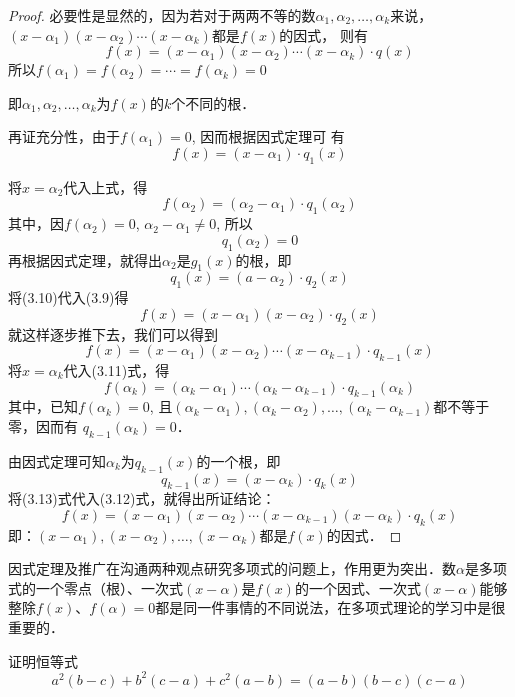 \begin{proof}
必要性是显然的，因为若对于两两不等的数$\alpha_1,\alpha_2,\ldots,\alpha_k$来说，$(x-\alpha_1)(x-\alpha_2)\cdots(x-\alpha_k)$都是$f(x)$的因式，
则有    
\[f(x)=(x-\alpha_1)(x-\alpha_2)\cdots(x-\alpha_k)\cdot q(x)\]
所以$f(\alpha_1)=f(\alpha_2) =\cdots=f(\alpha_k)=0$

即$\alpha_1,\alpha_2,\ldots,\alpha_k$为$f(x)$的$k$个不同的根．

再证充分性，由于$f(\alpha_1)=0$, 因而根据因式定理可
有
\begin{equation}
    f (x) = (x-\alpha_1) \cdot q_1 (x)
\end{equation}

将$x=\alpha_2$代入上式，得
\[f (\alpha_2) = (\alpha_2-\alpha_1) \cdot q_1(\alpha_2)\]
其中，因$f(\alpha_2)=0$, $\alpha_2-\alpha_1\ne 0$, 所以
\[q_1(\alpha_2)=0\]
再根据因式定理，就得出$\alpha_2$是$g_1(x)$的根，即
\begin{equation}
q_1(x)=(a-\alpha_2)\cdot q_2(x)
\end{equation}
将(3.10)代入(3.9)得
\begin{equation}
    f (x) = (x-\alpha_1) (x-\alpha_2)\cdot q_2(x)
\end{equation}
就这样逐步推下去，我们可以得到
\begin{equation}
    f (x) = (x-\alpha_1 ) (x-\alpha_2)\cdots(x-\alpha_{k-1})\cdot q_{k-1}(x) 
\end{equation}
将$x=\alpha_k$代入(3.11)式，得
\[f (\alpha_k) = (\alpha_k -\alpha_1)\cdots (\alpha_k-\alpha_{k-1})\cdot q_{k-1}(\alpha_k)\]
其中，已知$f(\alpha_k)=0$, 且$(\alpha_k-\alpha_1),(\alpha_{k}-\alpha_2),\ldots,(\alpha_k-\alpha_{k-1})$都不等于零，因而有 $q_{k-1}(\alpha_k)=0$．

由因式定理可知$\alpha_k$为$q_{k-1}(x)$的一个根，即
\begin{equation}
    q_{k-1}(x)=(x-\alpha_k)\cdot q_{k}(x)
\end{equation}
将(3.13)式代入(3.12)式，就得出所证结论：
\[f(x)=(x-\alpha_1)(x-\alpha_2)\cdots(x-\alpha_{k-1})(x-\alpha_k)\cdot q_k(x)\]
即：$(x-\alpha_1),(x-\alpha_2),\ldots,(x-\alpha_k)$都是$f(x)$的因式．
\end{proof}

因式定理及推广在沟通两种观点研究多项式的问题上，作用更为突出．数$\alpha$是多项式的一个零点（根）、一次式$(x-\alpha)$是$f(x)$的一个因式、一次式$(x-\alpha)$能够整除$f(x)$、$f(\alpha)=0$都是同一件事情的不同说法，在多项式理论的学习中是很重要的．


\begin{example}
证明恒等式
\[a^2(b-c)+b^2(c-a)+c^2(a-b)=(a-b)(b-c)(c-a)\]
\end{example}


